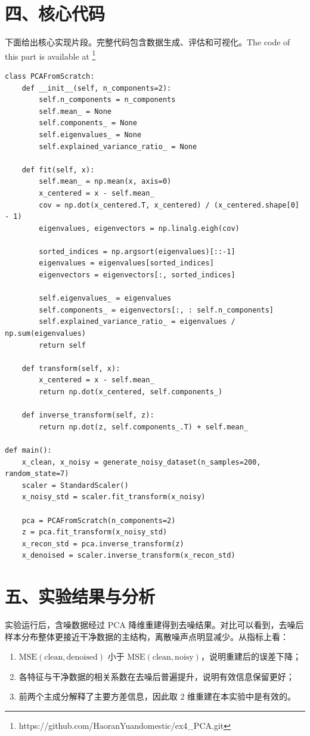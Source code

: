 \documentclass[12pt,a4paper]{ctexart}
\begin{document}
\section*{四、核心代码}
下面给出核心实现片段。完整代码包含数据生成、评估和可视化。The code of this part is available at \footnote{https://github.com/HaoranYuandomestic/ex4\_PCA.git}

\begin{lstlisting}
class PCAFromScratch:
	def __init__(self, n_components=2):
		self.n_components = n_components
		self.mean_ = None
		self.components_ = None
		self.eigenvalues_ = None
		self.explained_variance_ratio_ = None

	def fit(self, x):
		self.mean_ = np.mean(x, axis=0)
		x_centered = x - self.mean_
		cov = np.dot(x_centered.T, x_centered) / (x_centered.shape[0] - 1)
		eigenvalues, eigenvectors = np.linalg.eigh(cov)

		sorted_indices = np.argsort(eigenvalues)[::-1]
		eigenvalues = eigenvalues[sorted_indices]
		eigenvectors = eigenvectors[:, sorted_indices]

		self.eigenvalues_ = eigenvalues
		self.components_ = eigenvectors[:, : self.n_components]
		self.explained_variance_ratio_ = eigenvalues / np.sum(eigenvalues)
		return self

	def transform(self, x):
		x_centered = x - self.mean_
		return np.dot(x_centered, self.components_)

	def inverse_transform(self, z):
		return np.dot(z, self.components_.T) + self.mean_

def main():
	x_clean, x_noisy = generate_noisy_dataset(n_samples=200, random_state=7)
	scaler = StandardScaler()
	x_noisy_std = scaler.fit_transform(x_noisy)

	pca = PCAFromScratch(n_components=2)
	z = pca.fit_transform(x_noisy_std)
	x_recon_std = pca.inverse_transform(z)
	x_denoised = scaler.inverse_transform(x_recon_std)
\end{lstlisting}

\section*{五、实验结果与分析}
实验运行后，含噪数据经过 PCA 降维重建得到去噪结果。对比可以看到，去噪后样本分布整体更接近干净数据的主结构，离散噪声点明显减少。从指标上看：
\begin{enumerate}
	\item $\mathrm{MSE}(\text{clean},\text{denoised})$ 小于 $\mathrm{MSE}(\text{clean},\text{noisy})$，说明重建后的误差下降；
	\item 各特征与干净数据的相关系数在去噪后普遍提升，说明有效信息保留更好；
	\item 前两个主成分解释了主要方差信息，因此取 2 维重建在本实验中是有效的。
\end{enumerate}
\end{document}
